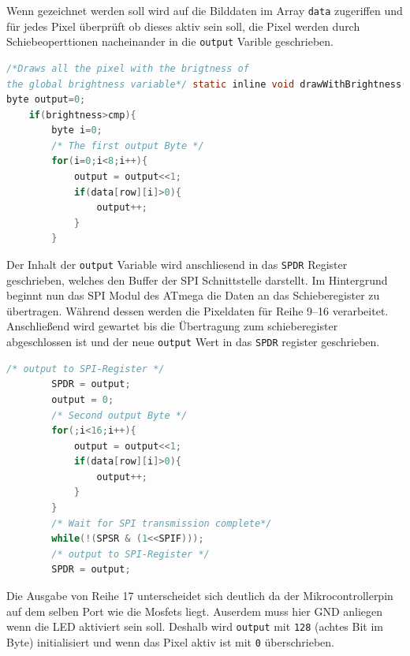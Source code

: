 Wenn gezeichnet werden soll wird auf die Bilddaten im Array \texttt{data}
zugeriffen und für jedes Pixel überprüft ob dieses aktiv sein soll, die Pixel
werden durch Schiebeoperttionen nacheinander in die \texttt{output} Varible
geschrieben. 

\begin{lstlisting}[language=C,label=dcf_state_data2,caption=Zeichenmethode zur
Ansteuerung der LED Matrix: Teil 1] 
/*Draws all the pixel with the brigtness of
the global brightness variable*/ static inline void drawWithBrightness(void){ 
byte output=0;
	if(brightness>cmp){
		byte i=0;
		/* The first output Byte */
		for(i=0;i<8;i++){
			output = output<<1;
			if(data[row][i]>0){
				output++;
			}
		}
\end{lstlisting} 

Der Inhalt der \texttt{output} Variable wird anschliesend in das
\texttt{SPDR} Register geschrieben, welches den Buffer der SPI Schnittstelle
darstellt. Im Hintergrund beginnt nun das SPI Modul des ATmega die Daten an das
Schieberegister zu übertragen. Während dessen werden die Pixeldaten für Reihe
9--16 verarbeitet. Anschließend wird gewartet bis die Übertragung zum
schieberegister abgeschlossen ist und der neue \texttt{output} Wert in das
\texttt{SPDR} register geschrieben.

\begin{lstlisting}[language=C,label=dcf_state_data2,caption=Zeichenmethode zur
Ansteuerung der LED Matrix: Teil 2]
		/* output to SPI-Register */
		SPDR = output;
		output = 0;
		/* Second output Byte */
		for(;i<16;i++){
			output = output<<1;
			if(data[row][i]>0){
				output++;
			}
		}
		/* Wait for SPI transmission complete*/
		while(!(SPSR & (1<<SPIF)));
		/* output to SPI-Register */
		SPDR = output;
\end{lstlisting} 

Die Ausgabe von Reihe 17 unterscheidet sich deutlich da der Mikrocontrollerpin
auf dem selben Port wie die Mosfets liegt. Auserdem muss hier GND anliegen wenn
die LED aktiviert sein soll. Deshalb wird \texttt{output} mit \texttt{128}
(achtes Bit im Byte) initialisiert und wenn das Pixel aktiv ist mit \texttt{0}
überschrieben.

